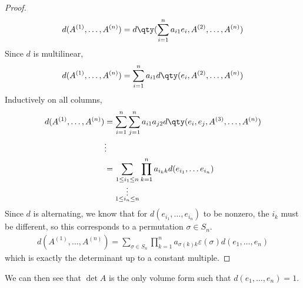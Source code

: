 \begin{proof}
	\begin{align*}
		d(A^{(1)}, \dots, A^{(n)}) = d\qty(\sum_{i=1}^n a_{i1} e_i, A^{(2)}, \dots, A^{(n)})
	\end{align*}
	Since $d$ is multilinear,
	\begin{align*}
		d(A^{(1)}, \dots, A^{(n)}) = \sum_{i=1}^n a_{i1} d\qty(e_i, A^{(2)}, \dots, A^{(n)})
	\end{align*}
	Inductively on all columns,
	\begin{align*}
		d(A^{(1)}, \dots, A^{(n)}) &= \sum_{i=1}^n \sum_{j=1}^n a_{i1} a_{j2} d\qty(e_i, e_j, A^{(3)}, \dots, A^{(n)})\\
		&\vdots \\
		&= \sum_{\substack{1 \leq i_1 \leq n \\ \vdots \\ 1 \leq i_n \leq n}} \prod_{k=1}^n a_{i_k k} d(e_{i_1}, \dots e_{i_n})
	\end{align*}
	Since $d$ is alternating, we know that for $d(e_{i_1}, \dots, e_{i_n})$ to be nonzero, the $i_k$ must be different, so this corresponds to a permutation $\sigma \in S_n$.
	\begin{align*}
		d(A^{(1)}, \dots, A^{(n)}) = \sum_{\sigma \in S_n} \prod_{k=1}^n a_{\sigma(k) k} \varepsilon(\sigma) d(e_1, \dots, e_n)
	\end{align*}
	which is exactly the determinant up to a constant multiple.
\end{proof}

\begin{corollary}
	We can then see that $\det A$ is the only volume form such that $d(e_1, \dots, e_n) = 1$.
\end{corollary} 

